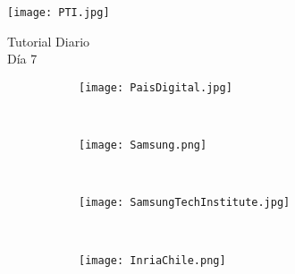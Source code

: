\begin{titlepage} %
  \thispagestyle{empty} %
  \begin{flushleft} %
    \texttt{[image: PTI.jpg]}
  \end{flushleft}
  \vfill
  \vspace{2cm} %
  \begin{center} %
    {
      \Huge Tutorial Diario\\
      \huge Día 7
    }
  \end{center}

  \vspace{5cm}

  \begin{figure}[H]
    \centering
    \begin{subfigure}[b]{0.2\textwidth}
      \centering
      \texttt{[image: PaisDigital.jpg]}
      \label{fig:Viper}
    \end{subfigure}
    ~
    \begin{subfigure}[b]{0.4\textwidth}
      \centering
      \texttt{[image: Samsung.png]}
      \label{fig:Phyrex}
    \end{subfigure}
    ~
    \begin{subfigure}[b]{0.23\textwidth}
      \centering
      \texttt{[image: SamsungTechInstitute.jpg]}
      \label{fig:Viper}
    \end{subfigure}
    ~\\
    \begin{subfigure}[b]{0.4\textwidth}
      \centering
      \texttt{[image: InriaChile.png]}
      \label{fig:Phyrex}
    \end{subfigure}
  \end{figure}

  \vfill
\end{titlepage}
